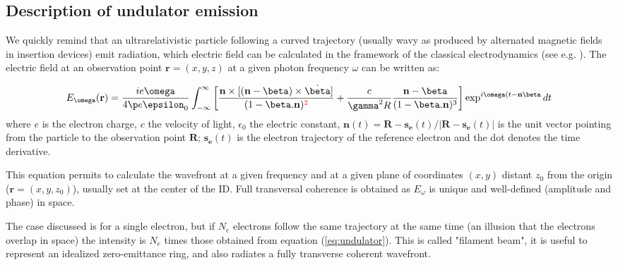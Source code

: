 \documentclass{iucr}              %
\newcommand{\inred}[1]{{\color{red}#1}}
\begin{document}
\subsection{Description of undulator emission}
\label{sec:undulator}

We quickly remind that an ultrarelativistic particle following a curved trajectory (usually wavy as produced by alternated magnetic fields in insertion devices) emit radiation, which electric field can be calculated in the framework of the classical electrodynamics (see e.g. \cite{jackson}). The electric field at an observation point $\textbf{r}=(x,y,z)$ at a given photon frequency $\omega$ can be written as: 

\begin{equation}
\label{eq:undulator}
    E_{\omega}(\textbf{r}) = \frac{i e \omega}{4 \p e \epsilon_0} 
    \int_{-\infty}^{\infty}
    \left[ 
    \frac{
    \textbf{n} \times [(\textbf{n} - \mathbf{\beta}) \times \dot{\mathbf{\beta}}]
    }
    {
    (1- \mathbf{\beta} . \textbf{n})^\inred{2}
    } +  
    \frac{c}{\gamma^2 R}   \frac{\textbf{n} - \mathbf{\beta}}{(1-\mathbf{\beta} . \textbf{n})^3} 
    \right] \exp^{i \omega (t - \textbf{n}\mathbf{\beta}} dt
\end{equation}
where $e$ is the electron charge, $c$ the velocity of light, $\epsilon_0$ the electric constant,
$\textbf{n}(t)=\textbf{R}-\textbf{s}_{\textbf{e}}(t)/|\textbf{R}-\textbf{s}_{\textbf{e}}(t)|$ is the unit vector
pointing from the particle to the observation point $\textbf{R}$; $\textbf{s}_{\textbf{e}}(t)$ is the
electron trajectory of the reference electron and the dot denotes the time derivative.

This equation permits to calculate the wavefront at a given frequency and at a given plane of coordinates $(x,y)$ distant $z_0$ from the origin ($\textbf{r}=(x,y,z_0)$), usually set at the center of the ID. Full transversal coherence is obtained as $E_{\omega}$ is unique and well-defined (amplitude and phase) in space.

The case discussed is for a single electron, but if $N_e$ electrons follow the same trajectory at the same time (an illusion that the electrons overlap in space) the intensity is $N_e$ times those obtained from equation (\ref{eq:undulator}). This is called "filament beam", it is useful to represent an idealized zero-emittance ring, and also radiates a fully transverse coherent wavefront.
\end{document}
